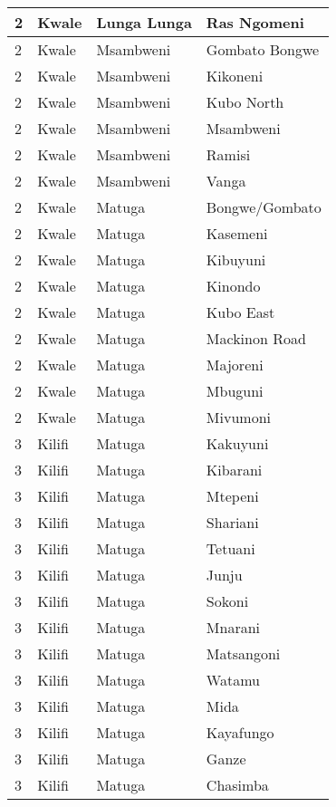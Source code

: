 \begin{table}[!ht]
\begin{tabular}{|l|l|l|l|}
        2 & Kwale & Lunga Lunga & Ras Ngomeni \\ \hline
        2 & Kwale & Msambweni & Gombato Bongwe \\ \hline
        2 & Kwale & Msambweni & Kikoneni \\ \hline
        2 & Kwale & Msambweni & Kubo North \\ \hline
        2 & Kwale & Msambweni & Msambweni \\ \hline
        2 & Kwale & Msambweni & Ramisi \\ \hline
        2 & Kwale & Msambweni & Vanga \\ \hline
        2 & Kwale & Matuga & Bongwe/Gombato \\ \hline
        2 & Kwale & Matuga & Kasemeni \\ \hline
        2 & Kwale & Matuga & Kibuyuni \\ \hline
        2 & Kwale & Matuga & Kinondo \\ \hline
        2 & Kwale & Matuga & Kubo East \\ \hline
        2 & Kwale & Matuga & Mackinon Road \\ \hline
        2 & Kwale & Matuga & Majoreni \\ \hline
        2 & Kwale & Matuga & Mbuguni \\ \hline
        2 & Kwale & Matuga & Mivumoni \\ \hline
        3 & Kilifi & Matuga & Kakuyuni \\ \hline
        3 & Kilifi & Matuga & Kibarani \\ \hline
        3 & Kilifi & Matuga & Mtepeni \\ \hline
        3 & Kilifi & Matuga & Shariani \\ \hline
        3 & Kilifi & Matuga & Tetuani \\ \hline
        3 & Kilifi & Matuga & Junju \\ \hline
        3 & Kilifi & Matuga & Sokoni \\ \hline
        3 & Kilifi & Matuga & Mnarani \\ \hline
        3 & Kilifi & Matuga & Matsangoni \\ \hline
        3 & Kilifi & Matuga & Watamu \\ \hline
        3 & Kilifi & Matuga & Mida \\ \hline
        3 & Kilifi & Matuga & Kayafungo \\ \hline
        3 & Kilifi & Matuga & Ganze \\ \hline
        3 & Kilifi & Matuga & Chasimba \\ \hline

\end{tabular}
\end{table}
